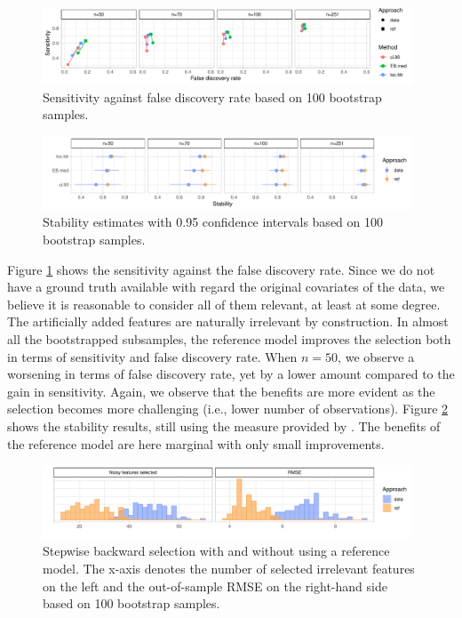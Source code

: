 \documentclass[american,]{article}
\theoremstyle{definition}
\begin{document}
\begin{figure}[tp]
  \centering
  \includegraphics[width=0.98\textwidth]{graphics/bodyfat_sensitivity_vs_fdr.pdf}
  \caption{Sensitivity against false discovery rate based on 100 bootstrap samples.\\}
  \label{fig:bodyfat_sensitivity_vs_fdr}
\end{figure}

\begin{figure}[tp]
  \centering
  \includegraphics[width=0.98\textwidth]{graphics/bodyfat_stability.pdf}
  \caption{Stability estimates with 0.95 confidence intervals based on 100 bootstrap samples.\\}
  \label{fig:bodyfat_stability}
\end{figure}

Figure \ref{fig:bodyfat_sensitivity_vs_fdr} shows the sensitivity
against the false discovery rate. Since we do not have a ground truth
available with regard the original covariates of the data, we believe
it is reasonable to consider all of them relevant, at least at some
degree. The artificially added features are naturally irrelevant by
construction. In almost all the bootstrapped subsamples, the reference
model improves the selection both in terms of sensitivity and false
discovery rate. When $n=50$, we observe a worsening in terms of false
discovery rate, yet by a lower amount compared to the gain in
sensitivity. Again, we observe that the benefits are more evident as
the selection becomes more challenging (i.e., lower number of
observations). Figure \ref{fig:bodyfat_stability} shows the stability
results, still using the measure provided by
\cite{paper:stability}. The benefits of the reference model are here
marginal with only small improvements.

\begin{figure}[tp]
  \centering
  \includegraphics[width=0.98\textwidth]{graphics/bodyfat_step_refvsdata.pdf}
  \caption{Stepwise backward selection with and without using a reference model. The x-axis denotes the number of selected irrelevant features on the left and the out-of-sample RMSE on the right-hand side based on 100 bootstrap samples.\\}
  \label{fig:bodyfat_step_refvsdata}
\end{figure}
\end{document}
